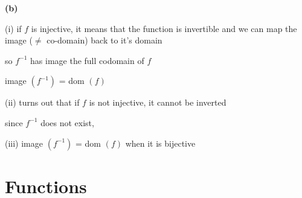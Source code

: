 \documentclass[12pts,A4]{article}
\begin{document}
\begin{flushleft}
    \textbf{(b)}

    (i) if $f$ is injective, it means that the function is invertible and we can map the image ($\not =$ co-domain) back to it's domain


        so $f^{-1}$ has image the full codomain of $f$

        image  $(f^{-1} )$ = dom $(f)$
        

    (ii) turns out that if $f$ is not injective, it cannot be inverted
        
        since $f^{-1}$ does not exist, 
        
    (iii) image  $(f^{-1} )$ = dom $(f)$ when it is bijective 
    
    
     
\end{flushleft}

\section{Functions}
\end{document}
